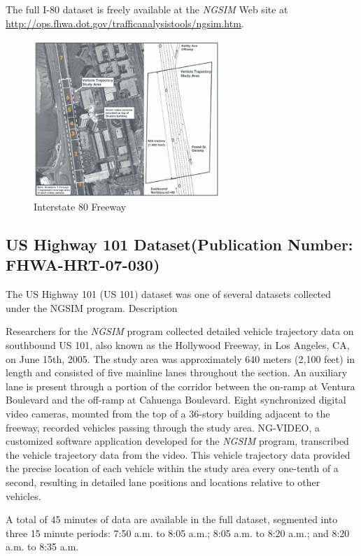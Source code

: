 The full I-80 dataset is freely available at the {\it NGSIM} Web site at \url{http://ops.fhwa.dot.gov/trafficanalysistools/ngsim.htm}.

\begin{figure}[H]
\begin{center}
\includegraphics[width=7cm]{./figures/image137b.jpg}
\caption{Interstate 80 Freeway}
\label{fig:pict_us80}
\end{center}
\end{figure}


\subsection{US Highway 101 Dataset(Publication Number: FHWA-HRT-07-030)}

The US Highway 101 (US 101) dataset was one of several datasets collected under the NGSIM program.
Description

Researchers for the {\it NGSIM} program collected detailed vehicle trajectory data on southbound US 101, also known as the Hollywood Freeway, in Los Angeles, CA, on June 15th, 2005. The study area was approximately 640 meters (2,100 feet) in length and consisted of five mainline lanes throughout the section. An auxiliary lane is present through a portion of the corridor between the on-ramp at Ventura Boulevard and the off-ramp at Cahuenga Boulevard. Eight synchronized digital video cameras, mounted from the top of a 36-story building adjacent to the freeway, recorded vehicles passing through the study area. NG-VIDEO, a customized software application developed for the {\it NGSIM} program, transcribed the vehicle trajectory data from the video. This vehicle trajectory data provided the precise location of each vehicle within the study area every one-tenth of a second, resulting in detailed lane positions and locations relative to other vehicles.

A total of 45 minutes of data are available in the full dataset, segmented into three 15 minute periods: 7:50 a.m. to 8:05 a.m.; 8:05 a.m. to 8:20 a.m.; and 8:20 a.m. to 8:35 a.m.

